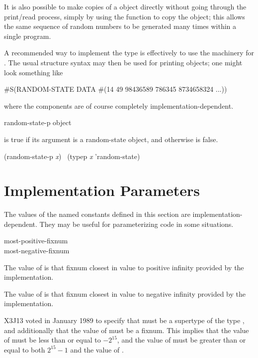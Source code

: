 \begin{defun}[Function]
\begin{rationale}
It is also possible to make copies of a  object
directly without going through the print/read process, simply by
using the  function to copy the object; this allows
the same sequence of random numbers to be generated many times
within a single program.
\end{rationale}
\betweennoterule
\begin{implementation}
A recommended way to implement the type 
is effectively to use the machinery for .
The usual structure syntax may then be used for printing 
objects; one might look something like
\begin{lisp}
\#S(RANDOM-STATE DATA \#(14 49 98436589 786345 8734658324 ...))
\end{lisp}
where the components are of course completely implementation-dependent.
\end{implementation}
\afternoterule
\end{defun}

\begin{defun}[Function]
random-state-p object

 is true if its argument is a random-state object,
and otherwise is false.
\begin{lisp}
(random-state-p \emph{x}) \EQ\ (typep \emph{x} 'random-state)
\end{lisp}
\end{defun}

\section{Implementation Parameters}

The values of the named constants defined in this section are
implementation-dependent.  They may be useful for parameterizing
code in some situations.

\begin{defun}[Constant]
most-positive-fixnum \\
most-negative-fixnum

The value of  is that fixnum closest in value to
positive infinity provided by the implementation.

The value of  is that fixnum closest in value to
negative infinity provided by the implementation.

\begin{new}
X3J13 voted in January 1989
to specify that  must be a supertype
of the type , and additionally that the value
of  must be a fixnum.  This implies that the value
of  must be less than or equal to $-2^{15}$,
and the value of  must be greater than or equal to
both $2^{15}-1$ and the value of .
\end{new}
\end{defun}

